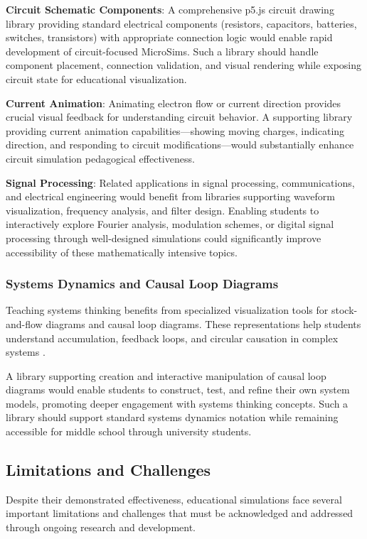 \textbf{Circuit Schematic Components}: A comprehensive p5.js circuit drawing library providing standard electrical components (resistors, capacitors, batteries, switches, transistors) with appropriate connection logic would enable rapid development of circuit-focused MicroSims. Such a library should handle component placement, connection validation, and visual rendering while exposing circuit state for educational visualization.

\textbf{Current Animation}: Animating electron flow or current direction provides crucial visual feedback for understanding circuit behavior. A supporting library providing current animation capabilities—showing moving charges, indicating direction, and responding to circuit modifications—would substantially enhance circuit simulation pedagogical effectiveness.

\textbf{Signal Processing}: Related applications in signal processing, communications, and electrical engineering would benefit from libraries supporting waveform visualization, frequency analysis, and filter design. Enabling students to interactively explore Fourier analysis, modulation schemes, or digital signal processing through well-designed simulations could significantly improve accessibility of these mathematically intensive topics.

\subsubsection{Systems Dynamics and Causal Loop Diagrams}

Teaching systems thinking benefits from specialized visualization tools for stock-and-flow diagrams and causal loop diagrams. These representations help students understand accumulation, feedback loops, and circular causation in complex systems \cite{eric2009}.

A library supporting creation and interactive manipulation of causal loop diagrams would enable students to construct, test, and refine their own system models, promoting deeper engagement with systems thinking concepts. Such a library should support standard systems dynamics notation while remaining accessible for middle school through university students.

\subsection{Limitations and Challenges}

Despite their demonstrated effectiveness, educational simulations face several important limitations and challenges that must be acknowledged and addressed through ongoing research and development.

